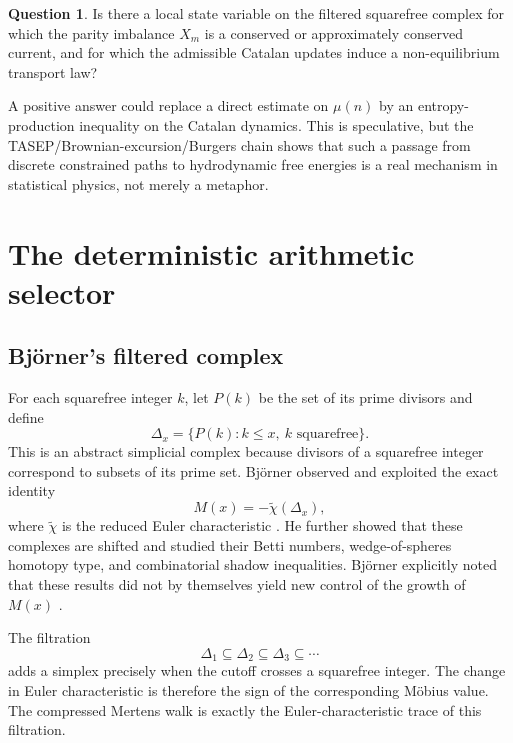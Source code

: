\documentclass[11pt]{amsart}
\numberwithin{equation}{section}
\theoremstyle{plain}
\theoremstyle{definition}
\newtheorem{question}[theorem]{Question}
\theoremstyle{remark}
\newcommand{\Mob}{\mu}
\newcommand{\Mert}{M}
\begin{document}
\begin{question}
\label{question:selector_as_current}
Is there a local state variable on the filtered squarefree complex for which the parity imbalance $X_m$ is a conserved or approximately conserved current, and for which the admissible Catalan updates induce a non-equilibrium transport law?
\end{question}

A positive answer could replace a direct estimate on $\Mob(n)$ by an entropy-production inequality on the Catalan dynamics.  This is speculative, but the TASEP/Brownian-excursion/Burgers chain shows that such a passage from discrete constrained paths to hydrodynamic free energies is a real mechanism in statistical physics, not merely a metaphor.

\section{The deterministic arithmetic selector}
\label{sec:arithmetic_selector}

\subsection{Björner's filtered complex}
\label{subsec:bjorner_complex}

For each squarefree integer $k$, let $P(k)$ be the set of its prime divisors and define
\begin{equation}
\Delta_x
=
\{P(k): k\le x,\ k\text{ squarefree}\}.
\label{eq:bjorner_complex}
\end{equation}
This is an abstract simplicial complex because divisors of a squarefree integer correspond to subsets of its prime set.  Bj\"orner observed and exploited the exact identity
\begin{equation}
\Mert(x)
=
-\widetilde\chi(\Delta_x),
\label{eq:mertens_euler_characteristic}
\end{equation}
where $\widetilde\chi$ is the reduced Euler characteristic \cite{Bjorner2011}.  He further showed that these complexes are shifted and studied their Betti numbers, wedge-of-spheres homotopy type, and combinatorial shadow inequalities.  Bj\"orner explicitly noted that these results did not by themselves yield new control of the growth of $\Mert(x)$ \cite{Bjorner2011}.

The filtration
\begin{equation}
\Delta_1\subseteq\Delta_2\subseteq\Delta_3\subseteq\cdots
\label{eq:simplicial_filtration}
\end{equation}
adds a simplex precisely when the cutoff crosses a squarefree integer.  The change in Euler characteristic is therefore the sign of the corresponding M\"obius value.  The compressed Mertens walk is exactly the Euler-characteristic trace of this filtration.
\end{document}
